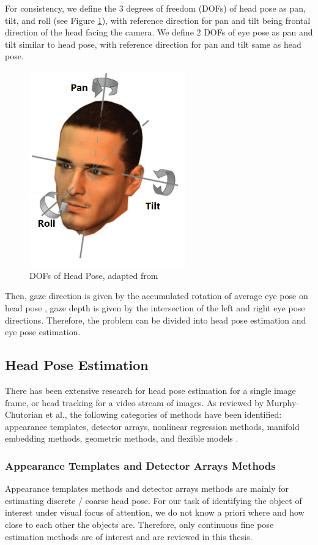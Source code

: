 \documentclass{ut-thesis}
\begin{document}
For consistency, we define the 3 degrees of freedom (DOFs) of head pose as pan, tilt, and roll (see Figure \ref{fig:murphy2009head}), with reference direction for pan and tilt being frontal direction of the head facing the camera.  We define 2 DOFs of eye pose as pan and tilt similar to head pose, with reference direction for pan and tilt same as head pose.
\begin{figure} [h]
	\centering
	\includegraphics[width=0.6\textwidth]{./img/murphy2009head.png}
	\caption{DOFs of Head Pose, adapted from \cite{murphy2009head}}
	\label{fig:murphy2009head}
\end{figure}


Then, gaze direction is given by the accumulated rotation of average eye pose on head pose \cite{funes2013person}, gaze depth is given by the intersection of the left and right eye pose directions.  Therefore, the problem can be divided into head pose estimation and eye pose estimation.


\subsection{Head Pose Estimation}
There has been extensive research for head pose estimation for a single image frame, or head tracking for a video stream of images.  As reviewed by Murphy-Chutorian et al., the following categories of methods have been identified: appearance templates, detector arrays, nonlinear regression methods, manifold embedding methods, geometric methods, and flexible models \cite{murphy2009head}.


\subsubsection{Appearance Templates and Detector Arrays Methods}
Appearance templates methods and detector arrays methods are mainly for estimating discrete / coarse head pose.  For our task of identifying the object of interest under visual focus of attention, we do not know a priori where and how close to each other the objects are.  Therefore, only continuous fine pose estimation methods are of interest and are reviewed in this thesis.
\end{document}
